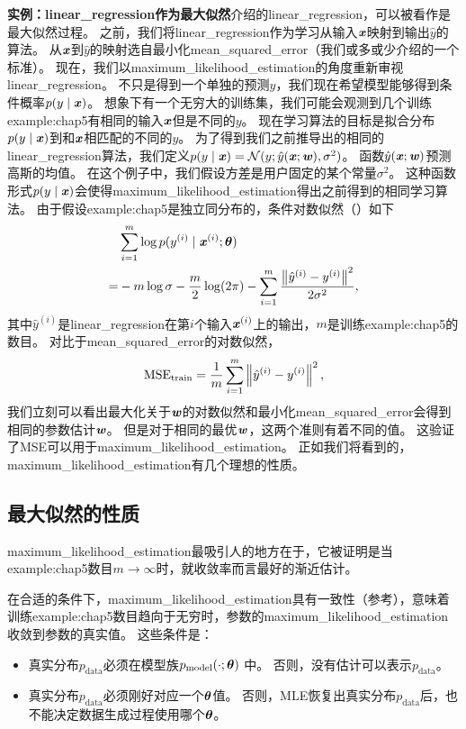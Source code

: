 \textbf{实例：\gls{linear_regression}作为最大似然}\quad {}介绍的\gls{linear_regression}，可以被看作是最大似然过程。
之前，我们将\gls{linear_regression}作为学习从输入$\boldsymbol{\mathit{x}}$映射到输出$\hat{y}$的算法。
从$\boldsymbol{\mathit{x}}$到$\hat{y}$的映射选自最小化\gls{mean_squared_error}（我们或多或少介绍的一个标准）。
现在，我们以\gls{maximum_likelihood_estimation}的角度重新审视\gls{linear_regression}。
不只是得到一个单独的预测$\hat{y}$，我们现在希望模型能够得到条件概率$p(y \mid \boldsymbol{\mathit{x}})$。
想象下有一个无穷大的训练集，我们可能会观测到几个训练\gls{example:chap5}有相同的输入$\boldsymbol{\mathit{x}}$但是不同的$y$。
现在学习算法的目标是拟合分布$p(y \mid \boldsymbol{\mathit{x}})$到和$\boldsymbol{\mathit{x}}$相匹配的不同的$y$。
为了得到我们之前推导出的相同的\gls{linear_regression}算法，我们定义$p(y \mid \boldsymbol{\mathit{x}}) = \mathcal{N}(y; \hat{y}(\boldsymbol{\mathit{x}}; \boldsymbol{\mathit{w}}), \sigma^2)$。
函数$\hat{y}(\boldsymbol{\mathit{x}}; \boldsymbol{\mathit{w}})$预测高斯的均值。
在这个例子中，我们假设方差是用户固定的某个常量$\sigma^2$。
这种函数形式$p(y \mid \boldsymbol{\mathit{x}})$会使得\gls{maximum_likelihood_estimation}得出之前得到的相同学习算法。
由于假设\gls{example:chap5}是独立同分布的，条件对数似然（）如下
\begin{align}
     & \sum_{i=1}^m \log p(y^{(i)} \mid \boldsymbol{\mathit{x}}^{(i)}; \boldsymbol{\theta}) \\
    =& -m \log\sigma - \frac{m}{2} \log(2\pi) - \sum_{i=1}^m \frac{ \left\lVert\hat{y}^{(i)} - y^{(i)} \right\rVert^2 }{2\sigma^2},
\end{align}
其中$\hat{y}^{(i)}$是\gls{linear_regression}在第$i$个输入$\boldsymbol{\mathit{x}}^{(i)}$上的输出，$m$是训练\gls{example:chap5}的数目。
对比于\gls{mean_squared_error}的对数似然，
\begin{equation}
    \text{MSE}_{\text{train}} = \frac{1}{m} \sum_{i=1}^m \left\lVert\hat{y}^{(i)} - y^{(i)}\right\rVert^2,
\end{equation}
我们立刻可以看出最大化关于$\boldsymbol{\mathit{w}}$的对数似然和最小化\gls{mean_squared_error}会得到相同的参数估计$\boldsymbol{\mathit{w}}$。
但是对于相同的最优$\boldsymbol{\mathit{w}}$，这两个准则有着不同的值。
这验证了MSE可以用于\gls{maximum_likelihood_estimation}。
正如我们将看到的，\gls{maximum_likelihood_estimation}有几个理想的性质。


\subsection{最大似然的性质}
\label{sec:properties_of_maximum_likelihood}
\gls{maximum_likelihood_estimation}最吸引人的地方在于，它被证明是当\gls{example:chap5}数目$m\to\infty$时，就收敛率而言最好的渐近估计。

在合适的条件下，\gls{maximum_likelihood_estimation}具有一致性（参考），意味着训练\gls{example:chap5}数目趋向于无穷时，参数的\gls{maximum_likelihood_estimation}收敛到参数的真实值。
这些条件是：
\begin{itemize}
    \item 真实分布$p_{\text{data}}$必须在模型族$p_{\text{model}}(\cdot; \boldsymbol{\theta})$ 中。
    否则，没有估计可以表示$p_{\text{data}}$。
    
    \item 真实分布$p_{\text{data}}$必须刚好对应一个$\boldsymbol{\theta}$值。
    否则，\gls{MLE}恢复出真实分布$p_{\text{data}}$后，也不能决定数据生成过程使用哪个$\boldsymbol{\theta}$。
\end{itemize}

